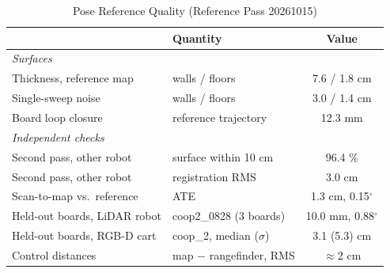 \begin{table}[!t]
\centering
\caption{Pose Reference Quality (Reference Pass 20261015)}
\label{tab:gt}
\footnotesize
\begin{tabular}{llc}
\toprule
& Quantity & Value \\
\midrule
\multicolumn{3}{l}{\emph{Surfaces}} \\
\quad Thickness, reference map & walls / floors & 7.6 / 1.8 cm \\
\quad Single-sweep noise       & walls / floors & 3.0 / 1.4 cm \\
\quad Board loop closure       & reference trajectory & 12.3 mm \\
\midrule
\multicolumn{3}{l}{\emph{Independent checks}} \\
\quad Second pass, other robot & surface within 10 cm & 96.4 \% \\
\quad Second pass, other robot & registration RMS & 3.0 cm \\
\quad Scan-to-map vs.\ reference & ATE & 1.3 cm, 0.15$^\circ$ \\
\quad Held-out boards, LiDAR robot & coop2\_0828 (3 boards) & 10.0 mm, 0.88$^\circ$ \\
\quad Held-out boards, RGB-D cart & coop\_2, median ($\sigma$) & 3.1 (5.3) cm \\
\quad Control distances & map $-$ rangefinder, RMS & $\approx$2 cm \\
\bottomrule
\end{tabular}
\end{table}
